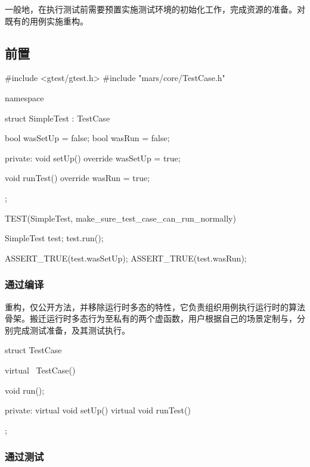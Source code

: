 \begin{content}

一般地，在执行测试前需要预置实施测试环境的初始化工作，完成资源的准备。对既有的用例实施重构。

\subsection{前置}

\begin{leftbar}
 \begin{c++}[caption={\ttfamily{test/mars/core/TestCaseSpec.cc}}]
#include <gtest/gtest.h>
#include "mars/core/TestCase.h"

namespace {
  struct SimpleTest : TestCase {
    bool wasSetUp = false;
    bool wasRun = false;

  private:
    void setUp() override {
      wasSetUp = true;
    }

    void runTest() override {
      wasRun = true;
    }
  };
}

TEST(SimpleTest, make_sure_test_case_can_run_normally) {
  SimpleTest test;
  test.run();

  ASSERT_TRUE(test.wasSetUp);
  ASSERT_TRUE(test.wasRun);
}
 \end{c++}
\end{leftbar}

\subsubsection{通过编译}

重构，仅公开方法，并移除运行时多态的特性，它负责组织用例执行运行时的算法骨架。搬迁运行时多态行为至私有的两个虚函数，用户根据自己的场景定制与，分别完成测试准备，及其测试执行。

\begin{leftbar}
 \begin{c++}[caption={\ttfamily{include/mars/core/TestCase.h}}]
struct TestCase {
  virtual ~TestCase() {}

  void run();

private:
  virtual void setUp() {}
  virtual void runTest() {}
};
  \end{c++}
\end{leftbar}

\subsubsection{通过测试}


\end{content}
